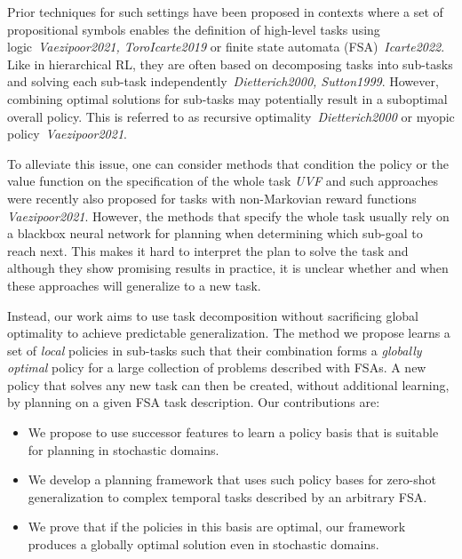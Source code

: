 Prior techniques for such settings have been proposed in contexts where a set of propositional symbols enables the definition of high-level tasks using logic~\textit{Vaezipoor2021, ToroIcarte2019}
or finite state automata (FSA)~\textit{Icarte2022}. Like in hierarchical RL,
they are often based on decomposing tasks into sub-tasks and solving each sub-task independently~\textit{Dietterich2000, Sutton1999}. 
However, combining optimal solutions for sub-tasks may potentially result in a suboptimal overall policy. 
This is referred to as recursive optimality~\textit{Dietterich2000} or myopic policy~\textit{Vaezipoor2021}. 

To alleviate this issue, one can consider methods that condition the policy or the value function on the specification of the whole task \textit{UVF} and such approaches were recently also proposed for tasks with non-Markovian reward functions \textit{Vaezipoor2021}. However, the methods that specify the whole task usually rely on a blackbox neural network for planning when determining which sub-goal to reach next. This makes it hard to interpret the plan to solve the task and although  they show promising results in practice, %
it is unclear whether and when these approaches will generalize to a new task.


Instead, our work aims to use task decomposition without sacrificing global optimality to achieve predictable generalization. The method we propose learns a set of \textit{local} policies in sub-tasks such that their combination forms a \textit{globally optimal} policy for a large collection of problems described with FSAs. A new policy that solves any new task can then be created, without additional learning, by planning on a given FSA task description. Our contributions are:
 \begin{itemize}
    \item We propose to use successor features to learn a policy basis that is suitable for planning in stochastic domains.
    \item We develop a planning framework that uses such policy bases for zero-shot generalization to complex temporal tasks described by an arbitrary FSA.
    \item We prove that if the policies in this basis are optimal, our framework produces a globally optimal solution even in stochastic domains.
\end{itemize}



